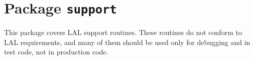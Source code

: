 \chapter{Package \texttt{support}}

This package covers LAL support routines.  These routines do not conform to
LAL requirements, and many of them should be used only for debugging and in
test code, not in production code.

\newpage
\newpage
\newpage
\newpage
\newpage
\newpage
\newpage
